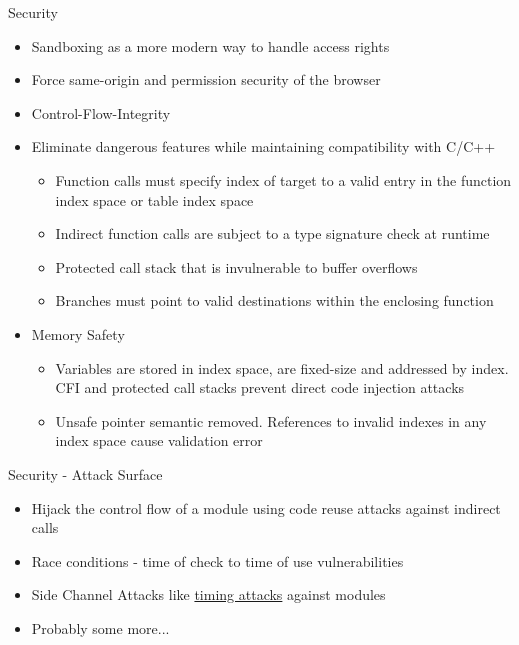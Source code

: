 \documentclass{beamer}
\begin{document}
\begin{frame}{Security}
    \begin{itemize}
        \item Sandboxing as a more modern way to handle access rights
        \item Force same-origin and permission security of the browser
        \item Control-Flow-Integrity
        \item Eliminate dangerous features while maintaining compatibility with C/C++
              \begin{itemize}
                  \item Function calls must specify index of target to a valid entry in the function index space or table index space
                  \item Indirect function calls are subject to a type signature check at runtime
                  \item Protected call stack that is invulnerable to buffer overflows
                  \item Branches must point to valid destinations within the enclosing function
              \end{itemize}
        \item Memory Safety
            \begin{itemize}
                \item Variables are stored in index space, are fixed-size and addressed by index. CFI and protected call stacks prevent direct code injection attacks
                \item Unsafe pointer semantic removed. References to invalid indexes in any index space cause validation error
            \end{itemize}
    \end{itemize}
\end{frame}

\begin{frame}{Security - Attack Surface}
    \begin{itemize}
        \item Hijack the control flow of a module using code reuse attacks against indirect calls
        \item Race conditions - time of check to time of use vulnerabilities
        \item Side Channel Attacks like \href{https://github.com/tc39/ecmascript_sharedmem/blob/master/issues/TimingAttack.md}{timing attacks} against modules
        \item Probably some more...
    \end{itemize}
\end{frame}
\end{document}
